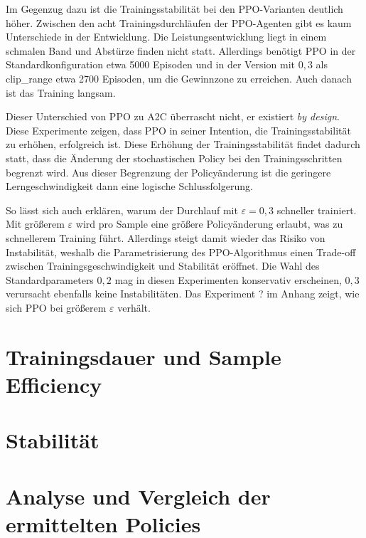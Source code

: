 Im Gegenzug dazu ist die Trainingsstabilität bei den PPO-Varianten deutlich höher.
Zwischen den acht Trainingsdurchläufen der PPO-Agenten gibt es kaum Unterschiede in der Entwicklung.
Die Leistungsentwicklung liegt in einem schmalen Band und Abstürze finden nicht statt.
Allerdings benötigt PPO in der Standardkonfiguration etwa 5000 Episoden und in der Version mit $0,3$ als clip_range etwa 2700 Episoden, um die Gewinnzone zu erreichen.
Auch danach ist das Training langsam.

Dieser Unterschied von PPO zu A2C überrascht nicht, er existiert \textit{by design}.
Diese Experimente zeigen, dass PPO in seiner Intention, die Trainingsstabilität zu erhöhen, erfolgreich ist.
Diese Erhöhung der Trainingsstabilität findet dadurch statt, dass die Änderung der stochastischen Policy bei den Trainingsschritten begrenzt wird.
Aus dieser Begrenzung der Policyänderung ist die geringere Lerngeschwindigkeit dann eine logische Schlussfolgerung.

So lässt sich auch erklären, warum der Durchlauf mit $\varepsilon=0,3$ schneller trainiert.
Mit größerem $\varepsilon$ wird pro Sample eine größere Policyänderung erlaubt, was zu schnellerem Training führt.
Allerdings steigt damit wieder das Risiko von Instabilität, weshalb die Parametrisierung des PPO-Algorithmus einen Trade-off zwischen Trainingsgeschwindigkeit und Stabilität eröffnet.
Die Wahl des Standardparameters $0,2$ mag in diesen Experimenten konservativ erscheinen, $0,3$ verursacht ebenfalls keine Instabilitäten.
Das Experiment ? im Anhang zeigt, wie sich PPO bei größerem $\varepsilon$ verhält.

\section{Trainingsdauer und Sample Efficiency}

\section{Stabilität}

\section{Analyse und Vergleich der ermittelten Policies}
